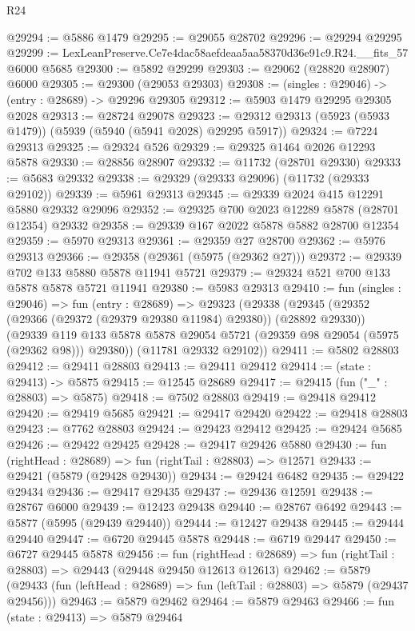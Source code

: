 \begin{lexlean}{R24}
\begin{coremodule}
@29294 := @5886 @1479
@29295 := @29055 @28702
@29296 := @29294 @29295
@29299 := LexLeanPreserve.Ce7e4dac58aefdeaa5aa58370d36e91c9.R24.__fits_57 @6000 @5685
@29300 := @5892 @29299
@29303 := @29062 (@28820 @28907) @6000
@29305 := @29300 (@29053 @29303)
@29308 := (singles : @29046) -> (entry : @28689) -> @29296 @29305
@29312 := @5903 @1479 @29295 @29305 @2028
@29313 := @28724 @29078
@29323 := @29312 @29313 (@5923 (@5933 @1479)) (@5939 (@5940 (@5941 @2028) @29295 @5917))
@29324 := @7224 @29313
@29325 := @29324 @526
@29329 := @29325 @1464 @2026 @12293 @5878
@29330 := @28856 @28907
@29332 := @11732 (@28701 @29330)
@29333 := @5683 @29332
@29338 := @29329 (@29333 @29096) (@11732 (@29333 @29102))
@29339 := @5961 @29313
@29345 := @29339 @2024 @415 @12291 @5880 @29332 @29096
@29352 := @29325 @700 @2023 @12289 @5878 (@28701 @12354) @29332
@29358 := @29339 @167 @2022 @5878 @5882 @28700 @12354
@29359 := @5970 @29313
@29361 := @29359 @27 @28700
@29362 := @5976 @29313
@29366 := @29358 (@29361 (@5975 (@29362 @27)))
@29372 := @29339 @702 @133 @5880 @5878 @11941 @5721
@29379 := @29324 @521 @700 @133 @5878 @5878 @5721 @11941
@29380 := @5983 @29313
@29410 := fun (singles : @29046) =>
  fun (entry : @28689) =>
  @29323
    (@29338
      (@29345
        (@29352 (@29366 (@29372 (@29379 @29380 @11984) @29380)) (@28892 @29330))
        (@29339 @119 @133 @5878 @5878 @29054 @5721 (@29359 @98 @29054 (@5975 (@29362 @98))) @29380))
      (@11781 @29332 @29102))
@29411 := @5802 @28803
@29412 := @29411 @28803
@29413 := @29411 @29412
@29414 := (state : @29413) -> @5875
@29415 := @12545 @28689
@29417 := @29415 (fun ("_" : @28803) => @5875)
@29418 := @7502 @28803
@29419 := @29418 @29412
@29420 := @29419 @5685
@29421 := @29417 @29420
@29422 := @29418 @28803
@29423 := @7762 @28803
@29424 := @29423 @29412
@29425 := @29424 @5685
@29426 := @29422 @29425
@29428 := @29417 @29426 @5880
@29430 := fun (rightHead : @28689) => fun (rightTail : @28803) => @12571
@29433 := @29421 (@5879 (@29428 @29430))
@29434 := @29424 @6482
@29435 := @29422 @29434
@29436 := @29417 @29435
@29437 := @29436 @12591
@29438 := @28767 @6000
@29439 := @12423 @29438
@29440 := @28767 @6492
@29443 := @5877 (@5995 (@29439 @29440))
@29444 := @12427 @29438
@29445 := @29444 @29440
@29447 := @6720 @29445 @5878
@29448 := @6719 @29447
@29450 := @6727 @29445 @5878
@29456 := fun (rightHead : @28689) =>
  fun (rightTail : @28803) => @29443 (@29448 @29450 @12613 @12613)
@29462 := @5879
    (@29433 (fun (leftHead : @28689) => fun (leftTail : @28803) => @5879 (@29437 @29456)))
@29463 := @5879 @29462
@29464 := @5879 @29463
@29466 := fun (state : @29413) => @5879 @29464

\end{coremodule}
\end{lexlean}
